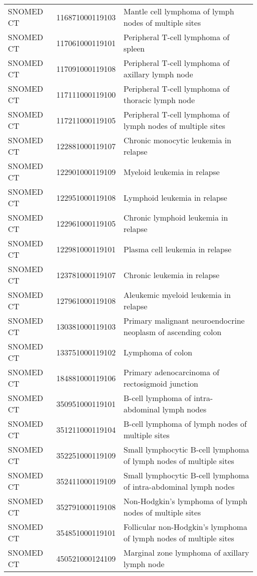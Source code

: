 \begin{longtable}{p{}p{}p{}}
  SNOMED CT & 116871000119103 & Mantle cell lymphoma of lymph nodes of multiple sites \\ 
  SNOMED CT & 117061000119101 & Peripheral T-cell lymphoma of spleen \\ 
  SNOMED CT & 117091000119108 & Peripheral T-cell lymphoma of axillary lymph node \\ 
  SNOMED CT & 117111000119100 & Peripheral T-cell lymphoma of thoracic lymph node \\ 
  SNOMED CT & 117211000119105 & Peripheral T-cell lymphoma of lymph nodes of multiple sites \\ 
  SNOMED CT & 122881000119107 & Chronic monocytic leukemia in relapse \\ 
  SNOMED CT & 122901000119109 & Myeloid leukemia in relapse \\ 
  SNOMED CT & 122951000119108 & Lymphoid leukemia in relapse \\ 
  SNOMED CT & 122961000119105 & Chronic lymphoid leukemia in relapse \\ 
  SNOMED CT & 122981000119101 & Plasma cell leukemia in relapse \\ 
  SNOMED CT & 123781000119107 & Chronic leukemia in relapse \\ 
  SNOMED CT & 127961000119108 & Aleukemic myeloid leukemia in relapse \\ 
  SNOMED CT & 130381000119103 & Primary malignant neuroendocrine neoplasm of ascending colon \\ 
  SNOMED CT & 133751000119102 & Lymphoma of colon \\ 
  SNOMED CT & 184881000119106 & Primary adenocarcinoma of rectosigmoid junction \\ 
  SNOMED CT & 350951000119101 & B-cell lymphoma of intra-abdominal lymph nodes \\ 
  SNOMED CT & 351211000119104 & B-cell lymphoma of lymph nodes of multiple sites \\ 
  SNOMED CT & 352251000119109 & Small lymphocytic B-cell lymphoma of lymph nodes of multiple sites \\ 
  SNOMED CT & 352411000119109 & Small lymphocytic B-cell lymphoma of intra-abdominal lymph nodes \\ 
  SNOMED CT & 352791000119108 & Non-Hodgkin's lymphoma of lymph nodes of multiple sites \\ 
  SNOMED CT & 354851000119101 & Follicular non-Hodgkin's lymphoma of lymph nodes of multiple sites \\ 
  SNOMED CT & 450521000124109 & Marginal zone lymphoma of axillary lymph node \\ 

\end{longtable}
